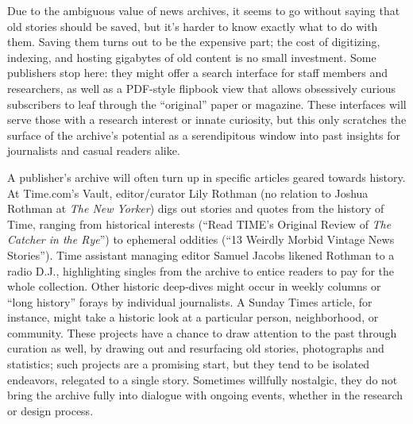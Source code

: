 Due to the ambiguous value of news archives, it seems to go without saying that old stories should be saved, but it's harder to know exactly what to do with them. Saving them turns out to be the expensive part; the cost of digitizing, indexing, and hosting gigabytes of old content is no small investment. Some publishers stop here: they might offer a search interface for staff members and researchers, as well as a PDF-style flipbook view that allows obsessively curious subscribers to leaf through the ``original'' paper or magazine. These interfaces will serve those with a research interest or innate curiosity, but this only scratches the surface of the archive's potential as a serendipitous window into past insights for journalists and casual readers alike.

A publisher's archive will often turn up in specific articles geared towards history. At Time.com's Vault, editor/curator Lily Rothman (no relation to Joshua Rothman at \emph{The New Yorker}) digs out stories and quotes from the history of Time, ranging from historical interests (``Read TIME's Original Review of \emph{The Catcher in the Rye}'') to ephemeral oddities (``13 Weirdly Morbid Vintage News Stories''). Time assistant managing editor Samuel Jacobs likened Rothman to a radio D.J., highlighting singles from the archive to entice readers to pay for the whole collection.\autocite{levy_time.com_2014} Other historic deep-dives might occur in weekly columns or ``long history'' forays by individual journalists. A Sunday Times article, for instance, might take a historic look at a particular person, neighborhood, or community. These projects have a chance to draw attention to the past through curation as well, by drawing out and resurfacing old stories, photographs and statistics; such projects are a promising start, but they tend to be isolated endeavors, relegated to a single story. Sometimes willfully nostalgic, they do not bring the archive fully into dialogue with ongoing events, whether in the research or design process.


